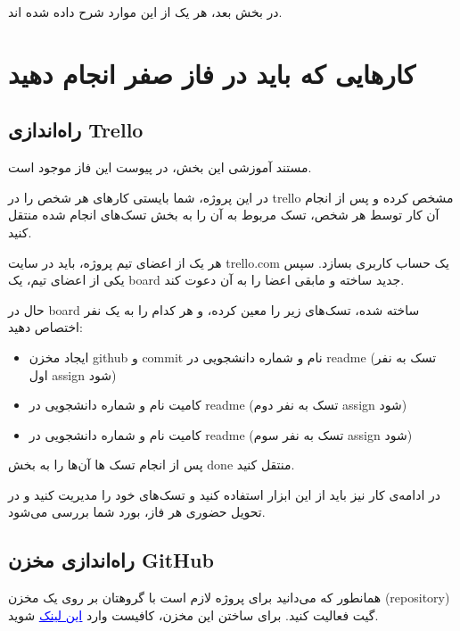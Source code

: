 \documentclass[]{article}
\begin{document}
در بخش بعد، هر یک از این موارد شرح داده شده اند.

\newpage
\section*{{\titr کارهایی که باید در فاز صفر انجام دهید}}


\subsection*{{\titr راه‌اندازی Trello}}
\label{subsec:trello}

مستند آموزشی این بخش، در پیوست این فاز موجود است.

در این پروژه، شما بایستی کارهای هر شخص را در  trello مشخص کرده و پس از انجام آن کار توسط هر شخص، تسک مربوط به آن را  به بخش تسک‌های انجام شده منتقل کنید.

هر یک از اعضای تیم پروژه، باید در سایت trello.com یک حساب کاربری بسازد. سپس یکی از اعضای تیم، یک board جدید ساخته و مابقی اعضا را به آن دعوت کند.

حال در board ساخته شده، تسک‌های زیر را معین کرده، و هر کدام را به یک نفر اختصاص دهید:

\begin{itemize}

\item
ایجاد مخزن github و commit نام و شماره دانشجویی در readme (تسک به نفر اول assign شود)

\item
کامیت نام و شماره دانشجویی در readme (تسک به نفر دوم assign شود)

\item
کامیت نام و شماره دانشجویی در readme (تسک به نفر سوم assign شود)

\end{itemize}

پس از انجام تسک ها آن‌ها را به بخش done منتقل کنید.

در ادامه‌ی کار نیز باید از این ابزار استفاده کنید ‌و تسک‌های خود را مدیریت کنید و در تحویل حضوری هر فاز، بورد شما بررسی می‌شود.


\newpage
\subsection*{{\titr راه‌اندازی مخزن GitHub}}
\label{subsec:github}

همانطور که می‌دانید برای پروژه لازم است با گروهتان بر روی یک مخزن (repository) گیت فعالیت کنید. برای ساختن این مخزن، کافیست وارد
 \href{https://classroom.github.com/g/5Uo3x-M4}{\textcolor{blue}{\underline{این لینک}}} 
 شوید.
\end{document}
